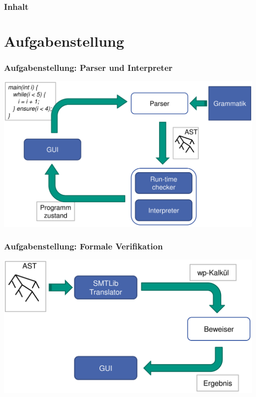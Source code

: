 \documentclass{beamer}
\author{Simon Bischof \and Jan Haag \and Adrian Herrmann \and Lin Jin \and Tobias Schlumberger \and Matthias Schnetz}
\title{\WProve}
\institute{Institut f\"ur Theoretische Informatik}
\begin{document}
\begin{frame}
\maketitle
\end{frame}

\begin{frame}
\frametitle{Inhalt}
\tableofcontents
\end{frame}

\section{Aufgabenstellung}
\begin{frame}
\frametitle{Aufgabenstellung: Parser und Interpreter}
\begin{center}
\includegraphics[scale=2.5]{images/ParserInterpreter.png}
\end{center}
\end{frame}

\begin{frame}
\frametitle{Aufgabenstellung: Formale Verifikation}
\begin{center}
\includegraphics[scale=2.5]{images/SMTLibTranslator.png}
\end{center}
\end{frame}
\end{document}
